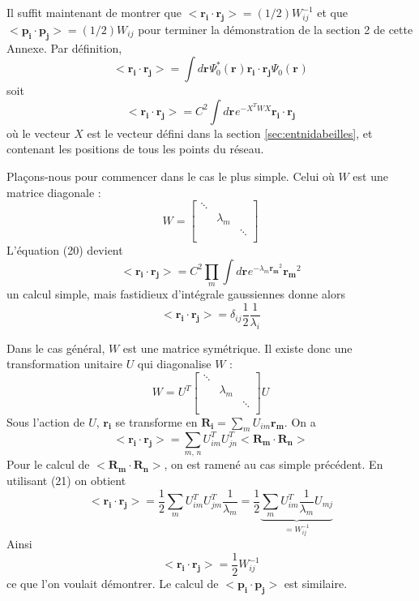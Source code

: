 \documentclass[a4paper, french]{report}
\newcommand{\pos}[1]{\ensuremath{\mathbf{r_{#1}}}\xspace}
\newcommand{\1}{\ensuremath{\ket{\om_1\bom_1}}\xspace}
\newcommand{\2}{\ensuremath{\ket{\om_2\bom_2}}\xspace}
\newcommand{\imp}[1]{\ensuremath{\mathbf{p_{#1}}}\xspace}
\newcommand{\Pos}[1]{\ensuremath{\mathbf{R_{#1}}}\xspace}
\begin{document}
Il suffit maintenant de montrer que $<\pos i \cdot \pos j>=(1/2)W^{-1}_{ij}$ et que $<\imp i\cdot \imp j>=(1/2)W_{ij}$ pour terminer la démonstration de la section 2 de cette Annexe.
Par définition,
\[
	<\pos i \cdot \pos j>=\int d\pos{}\Psi_0^*(\pos{})\pos i \cdot \pos j\Psi_0(\pos{})
\]
soit 
\begin{equation}
	<\pos i \cdot \pos j>=C^2\int d\pos{}e^{-X^TWX}\pos i \cdot \pos j 
\end{equation}
où le vecteur $X$ est le vecteur défini dans la section \ref{sec:entnidabeilles}, et contenant les positions de tous les points du réseau.

Plaçons-nous pour commencer dans le cas le plus simple. Celui où $W$ est une matrice diagonale :
\[
	W=
	\begin{bmatrix}
	\ddots\\
	~ & \lambda_m & ~\\
	~ & ~ & \ddots\\
	\end{bmatrix}
\]
L'équation (20) devient
\[
	<\pos i \cdot \pos j>=C^2\prod_m \int d\pos{}e^{-\lambda_m\pos{m}^2}\pos{m}^2
\]
un calcul simple, mais fastidieux d'intégrale gaussiennes donne alors
\begin{equation}
	<\pos i \cdot \pos j>=\delta_{ij}\frac{1}{2} \frac{1}{\lambda_i}
\end{equation}

Dans le cas général, $W$ est une matrice symétrique. Il existe donc une transformation unitaire $U$ qui diagonalise $W$ :
\begin{equation}
	W=U^T
	\begin{bmatrix}
	\ddots\\
	~ & \lambda_m & ~\\
	~ & ~ & \ddots\\
	\end{bmatrix}
	U
\end{equation}
Sous l'action de $U$, \pos{i} se transforme en $\Pos i=\sum_m U_{im}\pos m$.
On a
\[
	<\pos i \cdot \pos j>=\sum_{m \text{, } n}U^{T}_{im}U^{T}_{jn}<\Pos m \cdot \Pos n>
\]
Pour le calcul de $<\Pos m \cdot \Pos n>$, on est ramené au cas simple précédent. En utilisant (21) on obtient
\[
	<\pos i \cdot \pos j>=\frac{1}{2}\sum_mU_{im}^{T}U_{jm}^{T}\frac{1}{\lambda_m}=\frac{1}{2}\underbrace{\sum_mU_{im}^{T}\frac{1}{\lambda_m}U_{mj}}_{=W^{-1}_{ij}}
\]
Ainsi
\begin{equation}
	<\pos i \cdot \pos j>=\frac{1}{2}W^{-1}_{ij}
\end{equation}
ce que l'on voulait démontrer. Le calcul de $<\imp i \cdot \imp j>$ est similaire.
\end{document}
